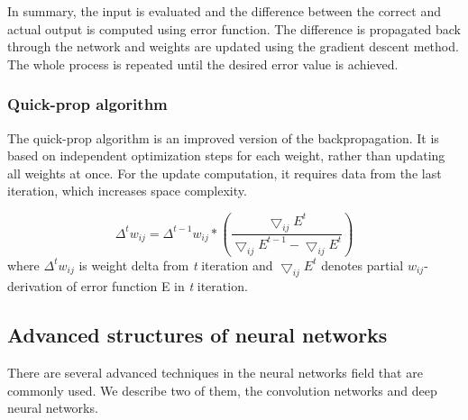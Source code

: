 In summary, the input is evaluated and the difference between the correct and actual output is computed using error function. The difference is propagated back through the network and weights are updated using the gradient descent method. The whole process is repeated until the desired error value is achieved.

\subsubsection{Quick-prop algorithm}
The quick-prop algorithm is an improved version of the backpropagation. It is based on independent optimization steps for each weight, rather than updating all weights at once. For the update computation, it requires data from the last iteration, which increases space complexity. 

\begin{equation*}
\Delta ^{t} w_{ij} = \Delta^{t-1} w_{ij}*(\frac {\bigtriangledown_{ij} E^{t}} {\bigtriangledown_{ij} E^{t-1} - \bigtriangledown_{ij} E^{t}})
\end{equation*}
where $\Delta ^{t} w_{ij}$ is weight delta from \emph{t} iteration and $\bigtriangledown_{ij} E^{t}$ denotes partial $w_{ij}$-derivation of error function E in \emph{t} iteration.

\subsection{Advanced structures of neural networks}
There are several advanced techniques in the neural networks field that are commonly used. We describe two of them, the convolution networks and deep neural networks.

